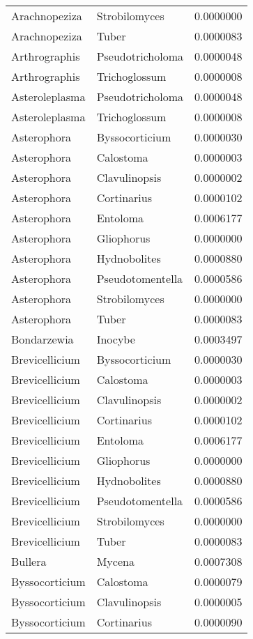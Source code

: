 \documentclass[border=1mm]{standalone}
\begin{document}
\begin{longtable}[t]{lll}
Arachnopeziza & Strobilomyces & 0.0000000\\
Arachnopeziza & Tuber & 0.0000083\\
\addlinespace
Arthrographis & Pseudotricholoma & 0.0000048\\
Arthrographis & Trichoglossum & 0.0000008\\
Asteroleplasma & Pseudotricholoma & 0.0000048\\
Asteroleplasma & Trichoglossum & 0.0000008\\
Asterophora & Byssocorticium & 0.0000030\\
\addlinespace
Asterophora & Calostoma & 0.0000003\\
Asterophora & Clavulinopsis & 0.0000002\\
Asterophora & Cortinarius & 0.0000102\\
Asterophora & Entoloma & 0.0006177\\
Asterophora & Gliophorus & 0.0000000\\
\addlinespace
Asterophora & Hydnobolites & 0.0000880\\
Asterophora & Pseudotomentella & 0.0000586\\
Asterophora & Strobilomyces & 0.0000000\\
Asterophora & Tuber & 0.0000083\\
Bondarzewia & Inocybe & 0.0003497\\
\addlinespace
Brevicellicium & Byssocorticium & 0.0000030\\
Brevicellicium & Calostoma & 0.0000003\\
Brevicellicium & Clavulinopsis & 0.0000002\\
Brevicellicium & Cortinarius & 0.0000102\\
Brevicellicium & Entoloma & 0.0006177\\
\addlinespace
Brevicellicium & Gliophorus & 0.0000000\\
Brevicellicium & Hydnobolites & 0.0000880\\
Brevicellicium & Pseudotomentella & 0.0000586\\
Brevicellicium & Strobilomyces & 0.0000000\\
Brevicellicium & Tuber & 0.0000083\\
\addlinespace
Bullera & Mycena & 0.0007308\\
Byssocorticium & Calostoma & 0.0000079\\
Byssocorticium & Clavulinopsis & 0.0000005\\
Byssocorticium & Cortinarius & 0.0000090\\

\end{longtable}
\end{document}
